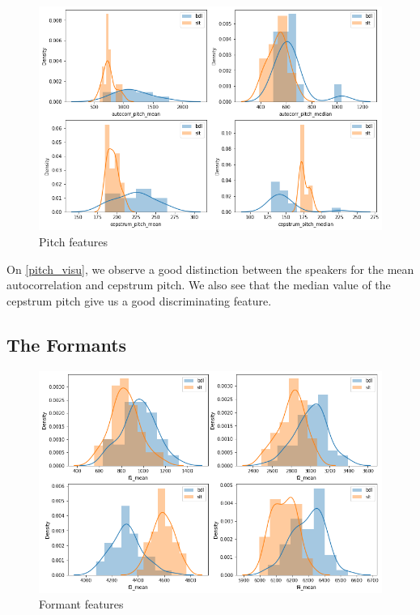 \documentclass[]{article}
\begin{document}
\begin{figure}[H]
    \centering
    \caption{Pitch features}
    \label{pitch_visu}
    \includegraphics[scale=0.5]{images/pitch_visu.png} 
\end{figure}


On \autoref{pitch_visu}, we observe a good distinction between the speakers for the mean autocorrelation
and cepstrum pitch. We also see that the median value of the cepstrum pitch give us a good
discriminating feature.

\subsection{The Formants}


\begin{figure}[H]
    \centering
    \caption{\label{formants_visu}Formant features}
    \includegraphics[scale=0.5]{images/formants_visu.png}
\end{figure}
\end{document}
